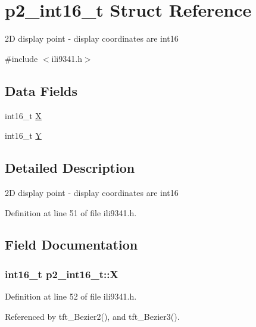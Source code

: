 \hypertarget{structp2__int16__t}{}\section{p2\+\_\+int16\+\_\+t Struct Reference}
\label{structp2__int16__t}


2D display point -\/ display coordinates are int16  




{\ttfamily \#include $<$ili9341.\+h$>$}

\subsection*{Data Fields}
\begin{DoxyCompactItemize}
\item 
int16\+\_\+t \hyperlink{structp2__int16__t_a017972fd9b6519624f8ebc119a11ced9}{X}
\item 
int16\+\_\+t \hyperlink{structp2__int16__t_a13502352cac20adbf543b35dc25bf76c}{Y}
\end{DoxyCompactItemize}


\subsection{Detailed Description}
2D display point -\/ display coordinates are int16 

Definition at line 51 of file ili9341.\+h.



\subsection{Field Documentation}
\subsubsection[{\texorpdfstring{X}{X}}]{\setlength{\rightskip}{0pt plus 5cm}int16\+\_\+t p2\+\_\+int16\+\_\+t\+::X}\hypertarget{structp2__int16__t_a017972fd9b6519624f8ebc119a11ced9}{}\label{structp2__int16__t_a017972fd9b6519624f8ebc119a11ced9}


Definition at line 52 of file ili9341.\+h.



Referenced by tft\+\_\+\+Bezier2(), and tft\+\_\+\+Bezier3().

